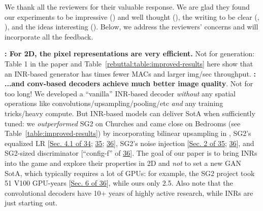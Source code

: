 \documentclass[rebuttal]{cvpr}
\newcommand{\ReviewerA}{\textcolor{cyan}{}}
\newcommand{\ReviewerB}{\textcolor{magenta}{}}
\newcommand{\ReviewerC}{\textcolor{violet}{}}
\newcommand{\ReviewerAsays}[1]{\textbf{\ReviewerA: \textbf{#1}}}
\begin{document}
\thispagestyle{empty}

We thank all the reviewers for their valuable response. We are glad they found our experiments to be impressive (\ReviewerB) and well thought (\ReviewerC), the writing to be clear (\ReviewerA, \ReviewerC), and the ideas interesting (\ReviewerB).
Below, we address the reviewers' concerns and will incorporate all the feedback.

\ReviewerAsays{For 2D, the pixel representations are very efficient.}
Not for generation:
Table 1 in the paper and Table~\ref{rebuttal:table:improved-results} here show that an INR-based generator has  times fewer MACs and larger img/sec throughput. \ReviewerAsays{...and conv-based decoders achieve much better image quality}.
Not for too long!
We developed a ``vanilla'' INR-based decoder \textit{without} any spatial operations like convolutions/upsampling/pooling/etc \textit{and} any training tricks/heavy compute.
But INR-based models can deliver SotA when sufficiently tuned: we \textit{outperformed} SG2 on Churches and came close on Bedrooms (see Table~\ref{table:improved-results})
by incorporating bilinear upsampling in , SG2's equalized LR [\href{https://arxiv.org/abs/1710.10196}{Sec. 4.1 of 34}; \href{https://arxiv.org/abs/1812.04948}{35}; \href{https://arxiv.org/abs/1912.04958}{36}], SG2's noise injection [\href{https://arxiv.org/abs/1812.04948}{Sec. 2 of 35}; \href{https://arxiv.org/abs/1912.04958}{36}], and SG2-sized discriminator [``config-f'' of \href{https://arxiv.org/abs/1912.04958}{36}].
The goal of our paper is to bring INRs into the game and explore their properties in 2D and \textit{not} to set a new GAN SotA, which typically requires a lot of GPUs: for example, the SG2 project took 51 V100 GPU-years [\href{https://arxiv.org/abs/1912.04958}{Sec. 6 of 36}], while ours only 2.5.
Also note that the convolutional decoders have 10+ years of highly active research, while INRs are just starting out.

\begin{table}
\caption{FID scores for additional ablations of our multi-scale INR-based GAN (INR-GAN).
Removing  from FMM \textit{worsens} the scores.
Incorporating StyleGAN2's architecture and bilinear upsampling allows the INR-based generator to rival its convolution-based counterpart.
Img/sec of  is measured on 1 NVidia V100 32GB.}
\label{table:improved-results}
\centering
{}
\end{table}
 
\end{document}
